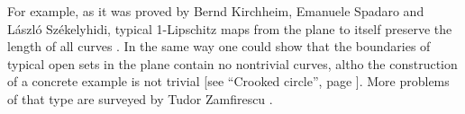 For example, as it was proved by
Bernd Kirchheim, 
Emanuele Spadaro 
and 
L{\'a}szl{\'o} Sz{\'e}kelyhidi,
typical 1-Lipschitz maps from the plane to itself preserve the length of all curves \cite{KSS}.
In the same way one could show that the boundaries of typical open sets in the plane contain no nontrivial curves, 
altho the construction of a concrete example is not trivial
[see ``Crooked circle'', page \pageref{Crooked circle}].
More problems of that type are surveyed by Tudor Zamfirescu \cite{zamfirescu}.







